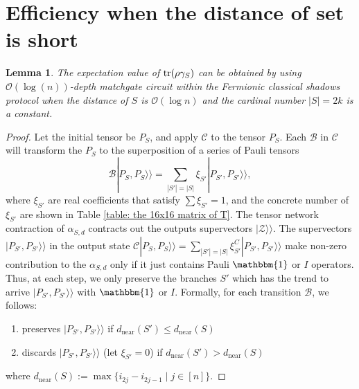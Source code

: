 \documentclass[showpacs,onecolumn,aps,prx,long bibliography,superscriptaddress,notitlepage]{revtex4-1}
\newtheorem{lemma}{Lemma}
\newcommand{\supket}[1]{|#1 \rangle\rangle}
\begin{document}
\section{Efficiency when the distance of set is short}
\label{appendix efficiency}
\begin{lemma}
\label{lemma: 7}
The expectation value of $\tr(\rho \gamma_S)$ can be obtained by using $\mathcal{O}(\log(n))$-depth matchgate circuit within the Fermionic classical shadows protocol when the distance of $S$ is $\mathcal{O}(\log n)$ and the cardinal number $|S| = 2k$ is a constant. 
\end{lemma}

\begin{proof}
    Let the initial tensor be $P_S$, and apply $\mathcal{C}$ to the tensor $P_S$. Each $\mathcal{B}$ in $\mathcal{C}$ will transform the $P_S$ to the superposition of a series of Pauli tensors
    \begin{equation}
        \mathcal{B} \supket{P_{S}, P_{S}} = \sum_{|S'| = |S|} \xi_{S'} \supket{P_{S'}, P_{S'}},
    \end{equation}
    where $\xi_{S'}$ are real coefficients that satisfy $\sum \xi_{S'} = 1$, and the concrete number of $\xi_{S'}$ are shown in Table \ref{table: the 16x16 matrix of T}.
    The tensor network contraction of $\alpha_{S,d}$ contracts out the 
    outputs supervectors $ \supket{\mathcal{Z}}$. The supervectors $\supket{P_{S'}, P_{S'}}$ in the output state $\mathcal{C} \supket{P_{S}, P_{S}} = \sum_{|S'| = |S|} \xi_{S'}^{C} \supket{P_{S'}, P_{S'}}$ make non-zero contribution to the $\alpha_{S,d}$ only if it just contains Pauli $\mathbbm{1}$ or $I$ operators. Thus, at each step, we only preserve the branches $S'$ which has the trend to arrive $\supket{P_{S'}, P_{S'}}$ with $\mathbbm{1}$ or $I$. Formally, for each transition $\mathcal{B}$, we follows:
    \begin{enumerate}
        \item preserves $\supket{P_{S'}, P_{S'}}$ if $d_\text{near}(S')\leq d_\text{near}(S)$
        \item discards $\supket{P_{S'}, P_{S'}}$ (let $\xi_{S'} = 0$) if $d_\text{near}(S')> d_\text{near}(S)$
     \end{enumerate}
    where $d_\text{near}(S):= \max\{ i_{2j} - i_{2j-1} \mid j \in [n] \}$. 
    
    


\end{proof}
\end{document}
